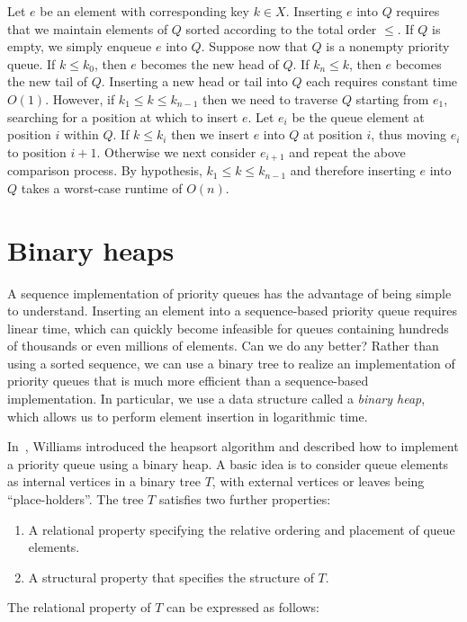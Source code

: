 Let $e$ be an element with corresponding key $k \in X$. Inserting $e$
into $Q$ requires that we maintain elements of $Q$ sorted according to
the total order $\leq$. If $Q$ is empty, we simply enqueue $e$ into
$Q$. Suppose now that $Q$ is a nonempty priority queue. If
$k \leq k_0$, then $e$ becomes the new head of $Q$. If $k_n \leq k$,
then $e$ becomes the new tail of $Q$. Inserting a new head or tail
into $Q$ each requires constant time $O(1)$. However, if
$k_1 \leq k \leq k_{n-1}$ then we need to traverse $Q$ starting from
$e_1$, searching for a position at which to insert $e$. Let $e_i$ be
the queue element at position $i$ within $Q$. If $k \leq k_i$ then we
insert $e$ into $Q$ at position $i$, thus moving $e_i$ to position
$i + 1$. Otherwise we next consider $e_{i+1}$ and repeat the above
comparison process. By hypothesis, $k_1 \leq k \leq k_{n-1}$ and
therefore inserting $e$ into $Q$ takes a worst-case runtime of $O(n)$.



\section{Binary heaps}

A sequence implementation of priority queues has the advantage of
being simple to understand. Inserting an element into a sequence-based
priority queue requires linear time, which can quickly become
infeasible for queues containing hundreds of thousands or even
millions of elements. Can we do any better? Rather than using a sorted
sequence, we can use a binary tree to realize an implementation of
priority queues that is much more efficient than a sequence-based
implementation. In particular, we use a data structure called a
\emph{binary heap}, which allows us to perform
element insertion in logarithmic time.

In~\cite{Williams1964}, Williams introduced
the heapsort algorithm and described how to implement
a priority queue using a binary heap. A basic idea
is to consider queue elements as internal vertices in a binary tree
$T$, with external vertices or leaves being ``place-holders''. The
tree $T$ satisfies two further properties:
\begin{enumerate}
\item A relational property specifying the relative ordering and
  placement of queue elements.

\item A structural property that specifies the structure of $T$.
\end{enumerate}
The relational property of $T$ can be expressed as follows:

